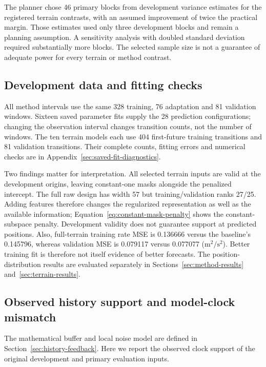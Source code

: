 \documentclass[11pt]{article}
\begin{document}
The planner chose 46 primary blocks from development variance estimates for
the registered terrain contrasts, with an assumed improvement of twice the
practical margin. Those estimates used only three development blocks and
remain a planning assumption. A sensitivity analysis with doubled standard
deviation required substantially more blocks. The selected sample size is
not a guarantee of adequate power for every terrain or method contrast.

\subsection{Development data and fitting checks}
\label{sec:development-fit-summary}
All method intervals use the same 328 training, 76 adaptation and 81 validation
windows. Sixteen saved parameter fits supply the 28 prediction configurations;
changing the observation interval changes transition counts, not the number
of windows. The ten terrain models each use 404 first-future training
transitions and 81 validation transitions. Their complete counts, fitting
errors and numerical checks are in Appendix~\ref{sec:saved-fit-diagnostics}.

Two findings matter for interpretation. All selected terrain inputs are
valid at the development origins, leaving constant-one masks alongside the
penalized intercept. The full raw design has width 57 but training/validation
ranks 27/25. Adding features therefore changes the regularized representation
as well as the available information; Equation~\eqref{eq:constant-mask-penalty}
shows the constant-subspace penalty. Development validity does not guarantee
support at predicted positions. Also, full-terrain training rate MSE is
0.136666 versus the baseline's 0.145796, whereas validation MSE is 0.079117
versus 0.077077 (\(\mathrm{m}^2/\mathrm{s}^2\)). Better training fit is therefore
not itself evidence of better forecasts. The position-distribution results
are evaluated separately in Sections~\ref{sec:method-results}
and~\ref{sec:terrain-results}.

\subsection{Observed history support and model-clock mismatch}
\label{sec:empirical-history-timings}
The mathematical buffer and local noise model are defined in
Section~\ref{sec:history-feedback}. Here we report the observed clock
support of the original development and primary evaluation inputs.
\end{document}
